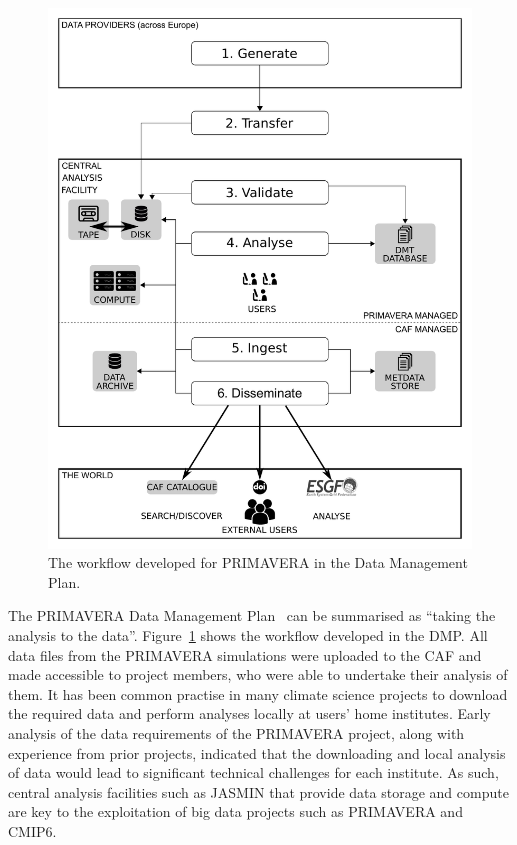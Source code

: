 \documentclass[gmd, manuscript]{copernicus}
\begin{document}
\begin{figure}[t]
\includegraphics[width=12cm]{fig01.pdf}
\caption{The workflow developed for PRIMAVERA in the Data Management Plan.}
\label{dmp_workflow}
\end{figure}

The PRIMAVERA Data Management Plan~\citep{Mizielinski2016} can be summarised as ``taking the analysis to the data''. Figure~\ref{dmp_workflow} shows the workflow developed in the DMP. All data files from the PRIMAVERA simulations were uploaded to the CAF and made accessible to project members, who were able to undertake their analysis of them. It has been common practise in many climate science projects to download the required data and perform analyses locally at users' home institutes. Early analysis of the data requirements of the PRIMAVERA project, along with experience from prior projects, indicated that the downloading and local analysis of data would lead to significant technical challenges for each institute. As such, central analysis facilities such as JASMIN that provide data storage and compute are key to the exploitation of big data projects such as PRIMAVERA and CMIP6.
\end{document}

